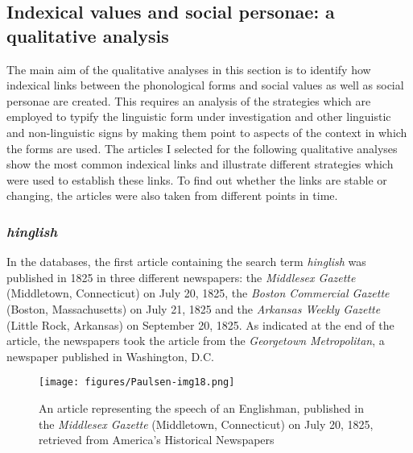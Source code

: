 \subsection{Indexical values and social personae: a qualitative analysis}
\label{bkm:Ref534386498}\hypertarget{Toc63021235}{}\label{bkm:Ref7775416}
The main aim of the qualitative analyses in this section is to identify how indexical links between the phonological forms and social values as well as social personae are created. This requires an analysis of the strategies which are employed to typify the linguistic form under investigation and other linguistic and non-linguistic signs by making them point to aspects of the context in which the forms are used. The articles I selected for the following qualitative analyses show the most common indexical links and illustrate different strategies which were used to establish these links. To find out whether the links are stable or changing, the articles were also taken from different points in time.


\subsubsection{\emph{hinglish}}
\hypertarget{Toc63021236}{}
In the databases, the first article containing the search term \emph{hinglish} was published in 1825 in three different newspapers: the \emph{Middlesex Gazette} (Middletown, Connecticut) on July 20, 1825, the \emph{Boston Commercial Gazette} (Boston, Massachusetts) on July 21, 1825 and the \emph{Arkansas Weekly Gazette} (Little Rock, Ar\-kan\-sas) on September 20, 1825. As indicated at the end of the article, the newspapers took the article from the \emph{Georgetown Metropolitan}, a newspaper published in Washington, D.C.




\begin{figure}
\texttt{[image: figures/Paulsen-img18.png]}
\caption{
An article representing the speech of an Englishman, published in the \emph{Middlesex Gazette} (Middletown, Connecticut) on July 20, 1825, retrieved from America's Historical Newspapers
}
\label{Figure18}
\end{figure}


